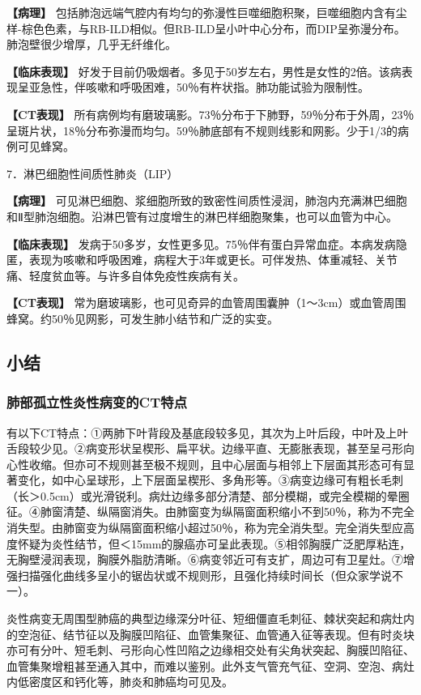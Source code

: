 \textbf{【病理】}
包括肺泡远端气腔内有均匀的弥漫性巨噬细胞积聚，巨噬细胞内含有尘样-棕色色素，与RB-ILD相似。但RB-ILD呈小叶中心分布，而DIP呈弥漫分布。肺泡壁很少增厚，几乎无纤维化。

\textbf{【临床表现】}
好发于目前仍吸烟者。多见于50岁左右，男性是女性的2倍。该病表现呈亚急性，伴咳嗽和呼吸困难，50％有杵状指。肺功能试验为限制性。

\textbf{【CT表现】}
所有病例均有磨玻璃影。73％分布于下肺野，59％分布于外周，23％呈斑片状，18％分布弥漫而均匀。59％肺底部有不规则线影和网影。少于1/3的病例可见蜂窝。

7．淋巴细胞性间质性肺炎（LIP）

\textbf{【病理】}
可见淋巴细胞、浆细胞所致的致密性间质性浸润，肺泡内充满淋巴细胞和Ⅱ型肺泡细胞。沿淋巴管有过度增生的淋巴样细胞聚集，也可以血管为中心。

\textbf{【临床表现】}
发病于50多岁，女性更多见。75％伴有蛋白异常血症。本病发病隐匿，表现为咳嗽和呼吸困难，病程大于3年或更长。可伴发热、体重减轻、关节痛、轻度贫血等。与许多自体免疫性疾病有关。

\textbf{【CT表现】}
常为磨玻璃影，也可见奇异的血管周围囊肿（1～3cm）或血管周围蜂窝。约50％见网影，可发生肺小结节和广泛的实变。

\subsection{小结}

\subsubsection{肺部孤立性炎性病变的CT特点}

有以下CT特点：①两肺下叶背段及基底段较多见，其次为上叶后段，中叶及上叶舌段较少见。②病变形状呈楔形、扁平状。边缘平直、无膨胀表现，甚至呈弓形向心性收缩。但亦可不规则甚至极不规则，且中心层面与相邻上下层面其形态可有显著变化，如中心呈球形，上下层面呈楔形、多角形等。③病变边缘可有粗长毛刺（长＞0.5cm）或光滑锐利。病灶边缘多部分清楚、部分模糊，或完全模糊的晕圈征。④肺窗清楚、纵隔窗消失。由肺窗变为纵隔窗面积缩小不到50％，称为不完全消失型。由肺窗变为纵隔窗面积缩小超过50％，称为完全消失型。完全消失型应高度怀疑为炎性结节，但＜15mm的腺癌亦可呈此表现。⑤相邻胸膜广泛肥厚粘连，无胸壁浸润表现，胸膜外脂肪清晰。⑥病变邻近可有支扩，周边可有卫星灶。⑦增强扫描强化曲线多呈小的锯齿状或不规则形，且强化持续时间长（但众家学说不一）。

炎性病变无周围型肺癌的典型边缘深分叶征、短细僵直毛刺征、棘状突起和病灶内的空泡征、结节征以及胸膜凹陷征、血管集聚征、血管通入征等表现。但有时炎块亦可有分叶、短毛刺、弓形向心性凹陷之边缘相交处有尖角状突起、胸膜凹陷征、血管集聚增粗甚至通入其中，而难以鉴别。此外支气管充气征、空洞、空泡、病灶内低密度区和钙化等，肺炎和肺癌均可见及。

